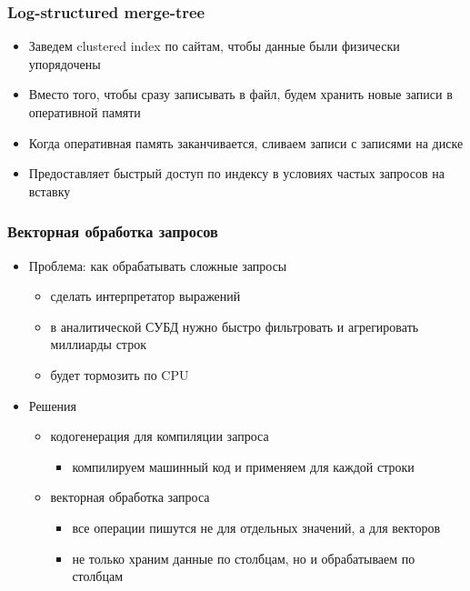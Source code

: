 \documentclass[xetex,mathserif,serif]{beamer}
\begin{document}
\begin{frame}
	\frametitle{Log-structured merge-tree}

	\begin{itemize}
		\item Заведем clustered index по сайтам, чтобы данные были физически упорядочены
		\item Вместо того, чтобы сразу записывать в файл, будем хранить новые записи в оперативной памяти
		\item Когда оперативная память заканчивается, сливаем записи с записями на диске
		\item Предоставляет быстрый доступ по индексу в условиях частых запросов на вставку
	\end{itemize}
\end{frame}


\begin{frame}
	\frametitle{Векторная обработка запросов}

	\begin{itemize}
		\item Проблема: как обрабатывать сложные запросы
		      \begin{itemize}
			      \item сделать интерпретатор выражений
			      \item в аналитической СУБД нужно быстро фильтровать и агрегировать миллиарды строк
			      \item будет тормозить по CPU
		      \end{itemize}
		\item Решения
		      \begin{itemize}
			      \item кодогенерация для компиляции запроса
			            \begin{itemize}
				            \item компилируем машинный код и применяем для каждой строки
			            \end{itemize}
			      \item векторная обработка запроса
			            \begin{itemize}
				            \item все операции пишутся не для отдельных значений, а для векторов
				            \item не только храним данные по столбцам, но и обрабатываем по столбцам
			            \end{itemize}
		      \end{itemize}
	\end{itemize}
\end{frame}
\end{document}
